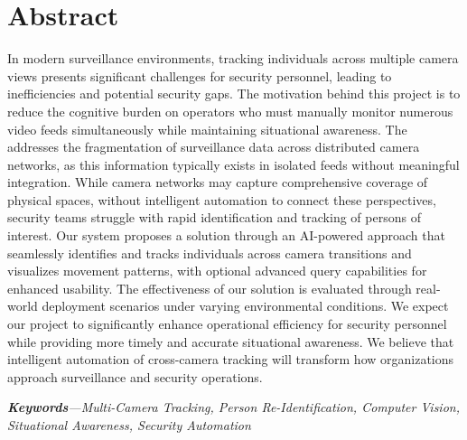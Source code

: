 \chapter*{Abstract}
\label{chap:abstract}

In modern surveillance environments, tracking individuals across multiple camera views presents significant challenges for security personnel, leading to inefficiencies and potential security gaps. The motivation behind this project is to reduce the cognitive burden on operators who must manually monitor numerous video feeds simultaneously while maintaining situational awareness. The \usevar{\srsTitle} addresses the fragmentation of surveillance data across distributed camera networks, as this information typically exists in isolated feeds without meaningful integration. While camera networks may capture comprehensive coverage of physical spaces, without intelligent automation to connect these perspectives, security teams struggle with rapid identification and tracking of persons of interest. Our system proposes a solution through an AI-powered approach that seamlessly identifies and tracks individuals across camera transitions and visualizes movement patterns, with optional advanced query capabilities for enhanced usability. The effectiveness of our solution is evaluated through real-world deployment scenarios under varying environmental conditions. We expect our project to significantly enhance operational efficiency for security personnel while providing more timely and accurate situational awareness. We believe that intelligent automation of cross-camera tracking will transform how organizations approach surveillance and security operations.

\par
\textit{\textbf{Keywords}---Multi-Camera Tracking, Person Re-Identification, Computer Vision, Situational Awareness, Security Automation}